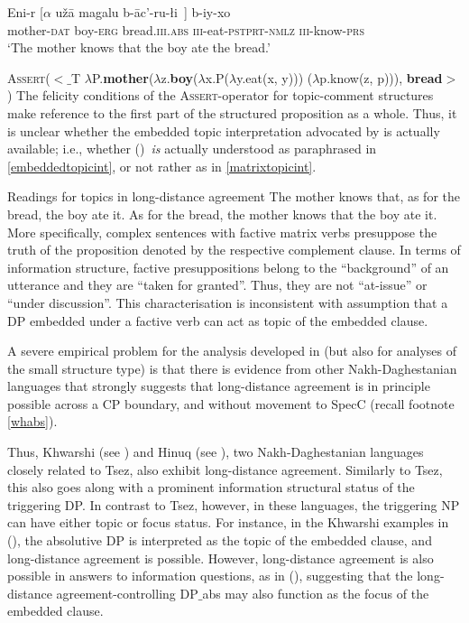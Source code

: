 \documentclass[output=paper
,modfonts
,nonflat]{langsci/langscibook}
\begin{document}
\ea\label{ex:mueller:13}
\gll    Eni-r [$\alpha$ u\v{z}\={a} \label{2d-b}magalu b-\={a}c'-ru-\l i~] b-iy-xo \\
     mother-{\scshape dat} {} boy-{\scshape erg} bread.{\scshape iii.abs} {\scshape iii}-eat-{\scshape pstprt-nmlz} {\scshape iii}-know-{\scshape prs} \\
\glt      `The mother knows that the boy ate the bread.'
\z

\ea\label{ex:mueller:14} {\scshape Assert}($<$$\_$T $\lambda$P.{\bfseries mother}($\lambda$z.{\bfseries boy}($\lambda$x.P($\lambda$y.eat(x, y))) ($\lambda$p.know(z, p))), {\bfseries bread}$>$)\z
The felicity conditions of the {\scshape Assert}-operator for topic-comment
structures make reference to the first part of the structured
proposition as a whole. Thus, it is unclear whether the embedded topic interpretation
advocated by \cite{Polinsky&Potsdam:01}  is actually available;
i.e.,  whether (\LLast)\ {\itshape is} actually understood as paraphrased in \ref{embeddedtopicint}, or not rather as in \ref{matrixtopicint}.
   
\ea\label{ex:mueller:15} Readings for topics in long-distance agreement
\ea \label{embeddedtopicint}The mother knows that, as for the bread, the boy ate it.
\ex \label{matrixtopicint}As for the bread, the mother knows that the boy ate it.
\z
\z
More specifically, complex sentences with factive matrix verbs
presuppose the truth of the proposition denoted by the respective
complement clause. In terms of information structure, factive
presuppositions belong to the ``background'' of an utterance and they
are ``taken for granted''. Thus, they are not ``at-issue'' or ``under
discussion''. This characterisation is inconsistent with
 assumption that a DP embedded under a factive verb
can act as topic of the embedded clause.


A severe empirical problem for the analysis developed in
\cite{Polinsky&Potsdam:01} (but also for analyses of the small
structure type) is that there is evidence from other Nakh-Daghestanian
languages that strongly suggests that long-distance agreement is in
principle possible across a CP boundary, and without movement to SpecC
(recall footnote \ref{whabs}). 

Thus, Khwarshi (see
\cite{Khalilova09}) and Hinuq (see \cite{Forker:11}), two
Nakh-Daghe\-stanian languages closely related to Tsez,
 also exhibit long-distance agreement. Similarly to Tsez, this
also goes along with a prominent information structural status of the
triggering DP. In contrast to Tsez, however, in these languages, the
triggering NP can have either topic or focus status.
For instance, in the Khwarshi examples in (\Next), the 
absolutive DP is interpreted as the topic of the embedded clause, and
long-distance agreement is possible.
However, long-distance agreement is also possible in answers to
information questions, as in (\NNext), suggesting that the
long-distance agreement-controlling DP$\_${abs} may also function as the focus of the embedded clause.
\end{document}
